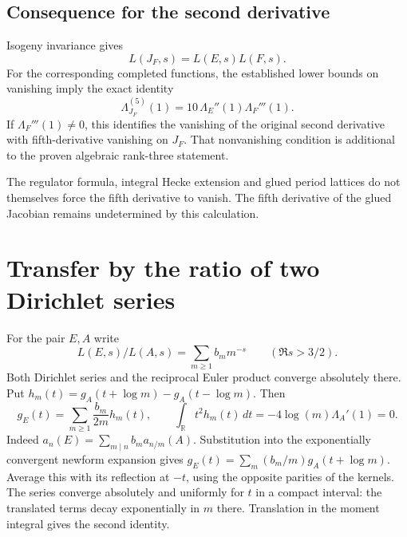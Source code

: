 \documentclass[11pt]{article}
\begin{document}
\subsection{Consequence for the second derivative}

Isogeny invariance gives
\[
L(J_F,s)=L(E,s)L(F,s).
\]
For the corresponding completed functions, the
established lower bounds on vanishing imply the exact
identity
\[
\boxed{
\Lambda_{J_F}^{(5)}(1)
=10\,\Lambda_E''(1)\Lambda_F'''(1).
}
\]
If \(\Lambda_F'''(1)\ne0\), this identifies the
vanishing of the original second derivative with
fifth-derivative vanishing on \(J_F\). That
nonvanishing condition is additional to the proven
algebraic rank-three statement.

The regulator formula, integral Hecke extension and
glued period lattices do not themselves force the
fifth derivative to vanish. The fifth derivative of the glued Jacobian remains undetermined by this calculation.

\section{Transfer by the ratio of two Dirichlet series}
For the pair \(E,A\) write
\[
L(E,s)/L(A,s)=\sum_{m\ge1} b_m m^{-s}\qquad(\Re s>3/2).
\]
Both Dirichlet series and the reciprocal Euler product converge
absolutely there. Put \(h_m(t)=g_A(t+\log m)-g_A(t-\log m)\).
Then
\begin{equation}\label{eq:ratio}
g_E(t)=\sum_{m\ge1}\frac{b_m}{2m}h_m(t),\qquad
\int_{\mathbb R}t^2h_m(t)\,dt=-4\log(m)\Lambda_A'(1)=0 .
\end{equation}
Indeed \(a_n(E)=\sum_{m\mid n}b_ma_{n/m}(A)\).
Substitution into the exponentially convergent newform expansion gives
\(g_E(t)=\sum_m(b_m/m)g_A(t+\log m)\). Average this with its reflection
at \(-t\), using the opposite parities of the kernels. The series
converge absolutely and uniformly for \(t\) in a compact interval:
the translated terms decay exponentially in \(m\) there. Translation
in the moment integral gives the second identity.
\end{document}
